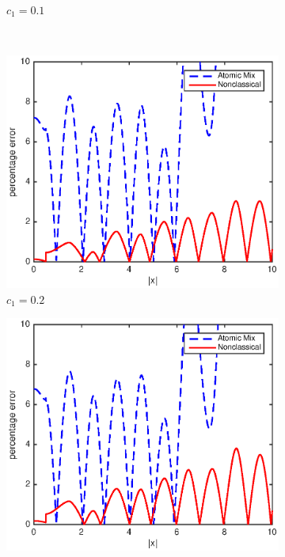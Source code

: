 \documentclass[12pt]{article}
\begin{document}
{\begin{figure}[p]
\begin{subfigure}{0.495\textwidth}
        \caption{$c_1 = 0.1$}
        \label{figerrB10}
    \end{subfigure}
    \\
    \centering
    \begin{subfigure}{0.495\textwidth}
        \centering
        \includegraphics[width=\textwidth]{NSE_err_B20.eps}
        \caption{$c_1 = 0.2$}
        \label{figerrB20}
    \end{subfigure}
    \hfill
    \begin{subfigure}{0.495\textwidth}
        \centering
        \includegraphics[width=\textwidth]{NSE_err_B30.eps}

\end{subfigure}
\end{figure}}
\end{document}
